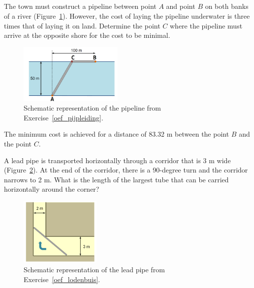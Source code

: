 \subsection*{}
\begin{Exercise}[difficulty = 1, label = oef_pijpleiding] The town must construct a pipeline between point $A$ and point $B$ on both banks of a river (Figure~\ref{fig_behaviour_33}). However, the cost of laying the pipeline underwater is three times that of laying it on land. Determine the point $C$ where the pipeline must arrive at the opposite shore for the cost to be minimal.  
\begin{figure}[H]
\centerline{
\includegraphics[width=0.45\textwidth]{figures/Behaviour/fig_behaviour_33}}
\caption{Schematic representation of the pipeline from Exercise~\ref{oef_pijpleiding}.}
\label{fig_behaviour_33}

\end{figure}

\end{Exercise}

\begin{Answer}\phantom{}
    The minimum cost is achieved for a distance of 83.32 m between the point $B$ and the point $C$.
\end{Answer}


\begin{Exercise}[difficulty = 2, label = oef_lodenbuis] A lead pipe is transported horizontally through a corridor that is 3 m wide (Figure~\ref{fig_behaviour_34}). At the end of the corridor, there is a 90-degree turn and the corridor narrows to 2 m. What is the length of the largest tube that can be carried horizontally around the corner?

\begin{figure}[H]
\centerline{
\includegraphics[width=0.35\textwidth]{figures/Behaviour/fig_behaviour_34}}
\caption{Schematic representation of the lead pipe from Exercise~\ref{oef_lodenbuis}.}
\label{fig_behaviour_34}
\end{figure}

\end{Exercise}


